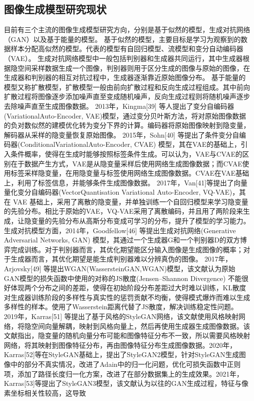 \subsection{图像生成模型研究现状}
目前有三个主流的图像生成模型研究方向，分别是基于似然的模型，生成对抗网络（GAN）以及基于能量的模型。\cite{luoUnderstandingDiffusionModels2022}
基于似然的模型，主要目标是学习为观察到的数据样本分配高似然的模型。代表的模型有自回归模型、流模型和变分自动编码器（VAE）。
生成对抗网络模型中一般包括判别器和生成器共同运行，其中生成器根据隐空间采样数据生成一个图像，判别器则用于区分生成的图像与原始的图像，在生成器和判别器的相互对抗过程中，生成器逐渐靠近原始图像分布。
基于能量的模型又称扩散模型，扩散模型一般由前向扩散过程和反向生成过程组成。其中前向扩散过程将图像逐步添加噪声直至变成随机噪声，反向生成过程则将随机噪声逐步去除噪声直至生成图像数据。
2013年，Kingma[39] 等人提出了变分自编码器(VariationalAuto-Encoder, VAE)模型，通过变分贝叶斯方法，将对原始图像数据的负对数似然的建模优化转为变分下界的计算。编码器将原始图像映射到隐变量，解码器从采样的隐变量恢复原始图像。
2015年，Sohn[40] 等提出了条件变分自编码器(ConditionalVariationalAuto-Encoder, CVAE) 模型，其在VAE的基础上，引入条件概率，使得在生成时能够按照标签条件生成。可以认为，VAE与CVAE的区别在于数据产生方式，VAE是从隐变量采样后使用网络生成图像数据；而CVAE使用标签采样隐变量，在用隐变量与标签使用网络生成图像数据。CVAE在VAE基础上，利用了标签信息，并能够条件生成图像数据。
2017年，Van[41]等提出了向量量化变分自编码器(VectorQuantisation Variational Auto-Encoder, VQ-VAE)，其在 VAE 基础上，采用了离散的隐变量，并单独训练一个自回归模型来学习隐变量的先验分布。相比于原始的VAE，VQ-VAE采用了离散编码，并且用了两阶段来生成，让隐变量的先验分布从高斯分布变成可学习的分布，提升了模型的学习能力。
生成对抗模型方面，2014年，Goodfellow[46] 等提出生成对抗网络(Generative Adversarial Networks, GAN) 模型，其通过一个生成器G和一个判别器D的双方博弈完成训练。对于判别器而言，其优化期望能区分输入图像是生成图像的概率；对于生成器而言，其优化期望是能生成判别器难以分辨真伪的图像。
2017年，Arjovsky[49] 等提出WGAN(WassersteinGAN,WGAN)模型，该文献认为原始GAN模型的损失函数中使用的对称的JS散度(Jensen–Shannon Divergence) 不能很好体现两个分布之间的差距，使得在初始阶段分布差距过大时难以训练，KL散度对生成器训练阶段的多样性与真实性的惩罚贡献不均衡，使得模式爆炸而难以生成多样性的样本。使用了Wasserstein距离代替了JS散度，解决训练稳定性问题。
2019年，Karras[51] 等提出了基于风格的StyleGAN网络，该文献使用风格映射网络，将隐空间向量解耦，映射到风格向量上，然后再使用生成器生成图像数据。该文献指出，隐变量的随机向量分布可能和图像特征分布不一致，所以需要风格映射网络，将其映射到图像特征分布，再由图像特征分布生成图像数据。2020年，Karras[52]等在StyleGAN基础上，提出了StyleGAN2模型，针对StyleGAN生成图像中的部分不真实情况，改进了Adain中的归一化问题，优化可损失函数中正则项，添加了路径长度归一化方案，改进了在部分数据集上的生成效果。2021年，Karras[53]等提出了StyleGAN3模型，该文献认为以往的GAN生成过程，特征与像素坐标相关性较高，这导致
